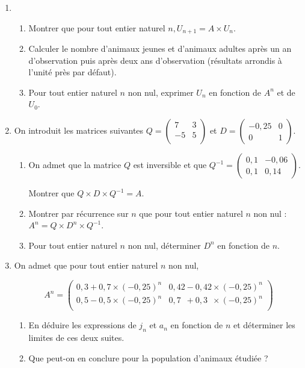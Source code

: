\documentclass[10pt]{article}
\begin{document}
\begin{enumerate}
\item 
	\begin{enumerate}
		\item Montrer que pour tout entier naturel $n, U_{n+ 1} = A \times U_{n}$. 
		\item Calculer le nombre d'animaux jeunes et d'animaux adultes après un an d'observation puis après deux ans d'observation (résultats arrondis à l'unité près par défaut). 
		\item Pour tout entier naturel $n$ non nul, exprimer $U_{n}$ en fonction de $A^n$ et de $U_{0}$. 
	\end{enumerate}
\item On introduit les matrices suivantes $Q = \begin{pmatrix}7&3\\-5& 5\\
\end{pmatrix}$ et $D = 	\begin{pmatrix}- 0,25&0\\0& 	1\end{pmatrix}$. 
	\begin{enumerate}
		\item On admet que la matrice $Q$ est inversible et que $Q^{- 1} = \begin{pmatrix} 0,1&-0,06\\0,1& 0,14\end{pmatrix}$. 

Montrer que $Q \times D \times Q^{- 1} = A$. 
		\item Montrer par récurrence sur $n$ que pour tout entier naturel $n$ non nul : $A^n = Q \times D^n \times Q^{- 1}$. 
		\item Pour tout entier naturel $n$ non nul, déterminer $D^n$ en fonction de $n$.
	\end{enumerate} 
\item On admet que pour tout entier naturel $n$ non nul, 

\[A^n = \begin{pmatrix}0,3 + 0,7 \times (- 0,25)^n&0,42 - 0,42 \times (- 0,25)^n \\
0,5 - 0,5 \times (- 0,25)^n& 0,7\phantom{0} + 0,3\phantom{0} \times (- 0,25)^n\\
\end{pmatrix}\]
 
	\begin{enumerate}
		\item En déduire les expressions de $j_{n}$ et $a_{n}$ en fonction de $n$ et déterminer les limites de ces deux suites. 
		\item Que peut-on en conclure pour la population d'animaux étudiée ? 
	\end{enumerate}
\end{enumerate}
\end{document}
